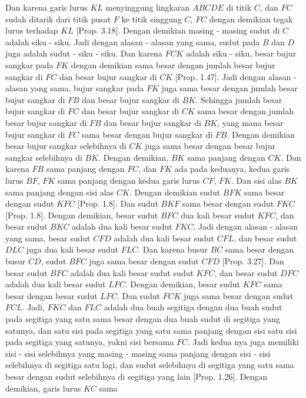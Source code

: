 \documentclass[a4paper]{book}
\begin{document}
Dan karena garis lurus $KL$ menyinggung lingkaran $ABCDE$ di titik $C$, 
dan $FC$ sudah ditarik dari titik pusat $F$ ke titik singgung $C$, $FC$
dengan demikian tegak lurus terhadap $KL$ [Prop. 3.18]. Dengan demikian
masing - masing sudut di $C$ adalah siku - siku. Jadi dengan alasan -
alasan yang sama, sudut pada $B$ dan $D$ juga adalah sudut - siku - siku.
Dan karena $FCK$ adalah siku - siku, besar bujur sangkar pada $FK$ 
dengan demikian sama besar dengan jumlah besar bujur sangkar di $FC$ dan
besar bujur sangkar di $CK$ [Prop. 1.47]. Jadi dengan alasan - alasan yang
sama, bujur sangkar pada $FK$ juga sama besar dengan jumlah besar bujur
sangkar di $FB$ dan besar bujur sangkar di $BK$. Sehingga jumlah besar 
bujur sangkar di $FC$ dan besar bujur sangkar di $CK$ sama besar dengan 
jumlah besar bujur sangkar di $FB$ dan besar bujur sangkar di $BK$, 
yang mana besar bujur sangkar di $FC$ sama besar dengan bujur sangkar di
$FB$. Dengan demikian besar bujur sangkar selebihnya di $CK$ juga sama 
besar dengan besar bujur sangkar selebihnya di $BK$. Dengan demikian,
$BK$ sama panjang dengan $CK$. Dan karena $FB$ sama panjang dengan $FC$, 
dan $FK$ ada pada keduanya, kedua garis lurus $BF$, $FK$ sama panjang
dengan  kedua garis lurus $CF$, $FK$. Dan sisi  alas $BK$ sama panjang
dengan sisi alas $CK$. Dengan demikian sudut $BFK$ sama besar dengan
sudut $KFC$ [Prop. 1.8]. Dan sudut $BKF$ sama besar dengan sudut $FKC$
[Prop. 1.8]. Dengan demikian, besar sudut $BFC$ dua kali besar sudut 
$KFC$, dan besar sudut $BKC$ adalah dua kali besar sudut $FKC$. Jadi 
dengan alasan - alasan yang sama, besar sudut $CFD$ adalah dua kali besar
sudut $CFL$, dan besar sudut $DLC$ juga dua kali besar sudut $FLC$. Dan
karena busur $BC$ sama besar dengan busur $CD$, sudut $BFC$ juga sama
besar dengan sudut $CFD$ [Prop. 3.27]. Dan besar sudut $BFC$  adalah dua
kali besar sudut sudut $KFC$, dan besar sudut $DFC$ adalah dua kali 
besar sudut $LFC$. Dengan demikian, besar sudut $KFC$ sama besar dengan
besar sudut $LFC$. Dan sudut $FCK$ juga sama besar dengan sudut $FCL$.
Jadi, $FKC$ dan $FLC$ adalah dua buah segitiga dengan dua buah sudut pada
segitiga yang satu sama besar dengan dua buah sudut di segitiga yang 
satunya, dan satu sisi pada segitiga yang satu sama panjang dengan sisi
satu sisi pada segitiga yang satunya, yakni sisi bersama $FC$. Jadi 
kedua nya juga memiliki sisi - sisi selebihnya yang masing - masing sama
panjang dengan sisi - sisi selebihnya di segitiga satu lagi, dan sudut
selebihnya di segitiga yang satu sama besar dengan sudut selebihnya di 
segitiga yang lain [Prop. 1.26]. Dengan demikian, garis lurus $KC$ sama
\end{document}
